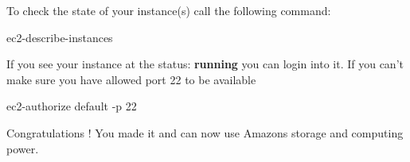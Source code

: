 To check the state of your instance(s) call the following command:

\begin{Command}{10cm}
ec2-describe-instances
\end{Command}

If you see your instance at the status: \textbf{running} you can login
into it. If you can't make sure you have allowed port 22 to be available

\begin{Command}{10cm}
ec2-authorize default -p 22
\end{Command}

Congratulations ! You made it and can now use Amazons storage and
computing power.


